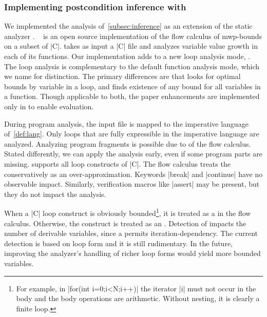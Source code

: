 \subsubsection{Implementing postcondition inference with \impl}
\label{subsec:implementation}

We implemented the analysis of~\autoref{subsec:inference} as an extension of the
static analyzer . ~\cite{aubert2023b} is an open source
implementation of the flow calculus of mwp-bounds  on a
subset of \pr|C|.  takes as input a \pr|C| file and analyzes
variable value growth in each of its functions. Our implementation adds to
 a new loop analysis mode, \ndx{\impl}. The loop analysis is
complementary to the default function analysis mode, which we name \ndx{\impf}
for distinction. The primary differences are that \ndx{\impl} looks for
{optimal} bounds by variable in a {loop}, and
\ndx{\impf} finds existence of {any} bound for all variables in a {function}.
Though applicable to both, the paper enhancements are implemented only in
\ndx{\impl} to enable evaluation.

During program analysis, the input file is mapped to the imperative language
of~\autoref{def:lang}. Only loops that are fully
expressible in the imperative language are analyzed. Analyzing program fragments
is possible due to  of the flow
calculus. Stated differently, we can apply the analysis
early, even if some program parts are missing.  supports all loop
constructs of \pr|C|. The flow calculus treats the  conservatively as an over-approximation. Keywords \pr|break| and
\pr|continue| have no observable impact. Similarly, verification macros like
\pr|assert| may be present, but they do not impact the
analysis.

When a \pr|C| loop construct is obviously bounded\footnote{For example,
in \pr|for(int i=0;i<N;i++)| the iterator \pr|i| must
not occur in the body and the body operations are arithmetic. Without nesting,
it is clearly a finite loop.}, it is treated as a  in the flow
calculus. Otherwise, the construct is treated as an
. Detection of  impacts the number of
derivable variables, since a  permits
iteration-dependency. The current detection
is based on loop form and it is still rudimentary. In the future, improving the
analyzer's handling of richer loop forms would yield more bounded variables.

